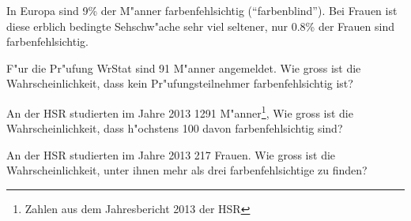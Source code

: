 In Europa sind 9\% der M"anner farbenfehlsichtig (``farbenblind'').
Bei Frauen ist diese erblich bedingte Sehschw"ache sehr viel seltener,
nur 0.8\% der Frauen sind farbenfehlsichtig.
\begin{teilaufgaben}
\item
F"ur die Pr"ufung WrStat sind 91 M"anner angemeldet.
Wie gross ist die Wahrscheinlichkeit, dass kein Pr"ufungsteilnehmer
farbenfehlsichtig ist?
\item
An der HSR studierten im Jahre 2013 1291
M"anner\footnote{Zahlen aus dem Jahresbericht 2013 der HSR},
Wie gross ist die Wahrscheinlichkeit, dass h"ochstens 100 davon
farbenfehlsichtig sind?
\item 
An der HSR studierten im Jahre 2013 217 Frauen. Wie gross ist die
Wahrscheinlichkeit, unter ihnen mehr als drei farbenfehlsichtige
zu finden?
\end{teilaufgaben}

